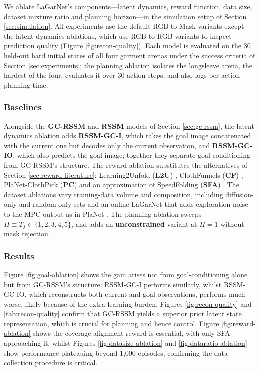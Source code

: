 \documentclass[journal]{IEEEtran}
\newif\ifshowrev\showrevtrue
\newcommand{\rev}[1]{\ifshowrev\textcolor{revblue}{#1}\else#1\fi}
\newif\ifshowirev\showirevtrue
\newcommand{\irev}[1]{\ifshowirev\textcolor{irevgreen}{#1}\else#1\fi}
\begin{document}
\rev{We ablate LaGarNet's components---latent dynamics, reward function, data size, dataset mixture ratio and planning horizon---in the simulation setup of Section \ref{sec:simulation}. All experiments use the default RGB-to-Mask variants except the latent dynamics ablations, which use RGB-to-RGB variants to inspect prediction quality (Figure \ref{fig:recon-quality}). Each model is evaluated on the 30 held-out hard initial states of all four garment arenas under the success criteria of Section \ref{sec:experiments}; the planning ablation isolates the longsleeve arena, the hardest of the four, \irev{evaluates it over 30 action steps}, and also logs per-action planning time.}

\subsubsection{Baselines}

\rev{Alongside the \textbf{GC-RSSM} and \textbf{RSSM} models of Section \ref{sec:gc-rssm}, the latent dynamics ablation adds \textbf{RSSM-GC-I}, which takes the goal image concatenated with the current one but decodes only the current observation, and \textbf{RSSM-GC-IO}, which also predicts the goal image; together they separate goal-conditioning from GC-RSSM's structure. The reward ablation substitutes the alternatives of Section \ref{sec:reward-literature}: Learning2Unfold (\textbf{L2U}) \cite{gu2023learning}, ClothFunnels (\textbf{CF}) \cite{canberk2023cloth}, PlaNet-ClothPick (\textbf{PC}) \cite{kadi2024planet} and an approximation of SpeedFolding (\textbf{SFA}) \cite{avigal2022speedfolding}. The dataset ablations vary training-data volume and composition, including diffusion-only and random-only sets and an online LaGarNet that adds exploration noise to the MPC output as in PlaNet \cite{hafner2019learning}. The planning ablation sweeps  \irev{$H \equiv T_f \in \{1,2,3,4, 5\}$}, and adds an \textbf{unconstrained} variant at $H = 1$ without mask rejection.}
 
\subsubsection{Results}

\rev{Figure \ref{fig:goal-ablation} shows the gain arises not from goal-conditioning alone but from GC-RSSM's structure: RSSM-GC-I performs similarly, whilst RSSM-GC-IO, which reconstructs both current and goal observations, performs much worse, likely because of the extra learning burden. Figures \ref{fig:recon-quality} and \ref{tab:recon-quality} confirm that GC-RSSM yields a superior prior latent state representation, which is crucial for planning and hence control. Figure \ref{fig:reward-ablation} shows the coverage-alignment reward is essential, with only SFA approaching it, whilst Figures \ref{fig:datasize-ablation} and \ref{fig:dataratio-ablation} show performance plateauing beyond 1,000 episodes, confirming the data collection procedure is critical.}
\end{document}
